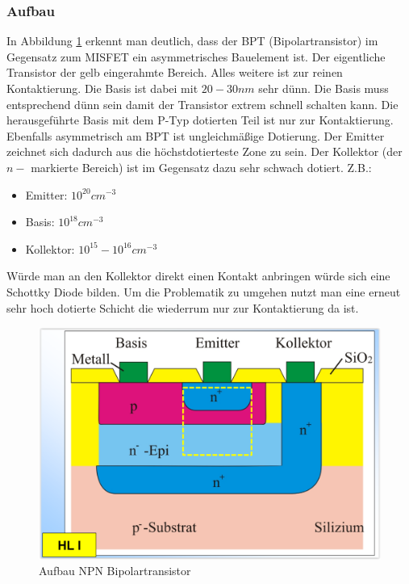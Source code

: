 \documentclass[12pt,a4paper]{report}%
\numberwithin{equation}{section}
\numberwithin{equation}{subsection}
\begin{document}
    \subsubsection{Aufbau}
    In Abbildung \ref{fig:bpt_aufbau} erkennt man deutlich, dass der BPT (Bipolartransistor) im Gegensatz zum MISFET ein asymmetrisches Bauelement ist. Der eigentliche Transistor der gelb eingerahmte Bereich. Alles weitere ist zur reinen Kontaktierung. Die Basis ist dabei mit $20-30nm$ sehr dünn. Die Basis muss entsprechend dünn sein damit der Transistor extrem schnell schalten kann. Die herausgeführte Basis mit dem P-Typ dotierten Teil ist nur zur Kontaktierung. Ebenfalls asymmetrisch am BPT ist ungleichmäßige Dotierung. Der Emitter zeichnet sich dadurch aus die höchstdotierteste Zone zu sein. Der Kollektor (der $n-$ markierte Bereich) ist im Gegensatz dazu sehr schwach dotiert. Z.B.:
    \begin{itemize}
      \item Emitter: $10^{20}cm^{-3}$
      \item Basis:  $10^{18}cm^{-3}$
      \item Kollektor:  $10^{15} - 10^{16}cm^{-3}$
    \end{itemize}
    Würde man an den Kollektor direkt einen Kontakt anbringen würde sich eine Schottky Diode bilden. Um die Problematik zu umgehen nutzt man eine erneut sehr hoch dotierte Schicht die wiederrum nur zur Kontaktierung da ist.
    \begin{figure}[H]
			  \centering
			  \captionsetup{justification=centering}
			  \includegraphics[width=0.6\linewidth]{bpt_aufbau.png}
			  \caption{Aufbau NPN Bipolartransistor \protect\cite{MIKRO2}}
			  \label{fig:bpt_aufbau}
		\end{figure}
\end{document}
